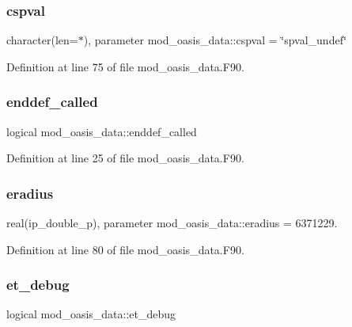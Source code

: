 \subsubsection{\texorpdfstring{cspval}{cspval}}
{\footnotesize\ttfamily character(len=$\ast$), parameter mod\+\_\+oasis\+\_\+data\+::cspval = \char`\"{}spval\+\_\+undef\char`\"{}}



Definition at line 75 of file mod\+\_\+oasis\+\_\+data.\+F90.

\mbox{\label{namespacemod__oasis__data_a5341a9152ef540667f7fcaa4f04c6399}} 
\subsubsection{\texorpdfstring{enddef\+\_\+called}{enddef\_called}}
{\footnotesize\ttfamily logical mod\+\_\+oasis\+\_\+data\+::enddef\+\_\+called}



Definition at line 25 of file mod\+\_\+oasis\+\_\+data.\+F90.

\mbox{\label{namespacemod__oasis__data_a7f361db125e5554d0427e964b698f10c}} 
\subsubsection{\texorpdfstring{eradius}{eradius}}
{\footnotesize\ttfamily real(ip\+\_\+double\+\_\+p), parameter mod\+\_\+oasis\+\_\+data\+::eradius = 6371229.}



Definition at line 80 of file mod\+\_\+oasis\+\_\+data.\+F90.

\mbox{\label{namespacemod__oasis__data_aaffd695f4c3185d0ac798d0b63fe612c}} 
\subsubsection{\texorpdfstring{et\+\_\+debug}{et\_debug}}
{\footnotesize\ttfamily logical mod\+\_\+oasis\+\_\+data\+::et\+\_\+debug}



